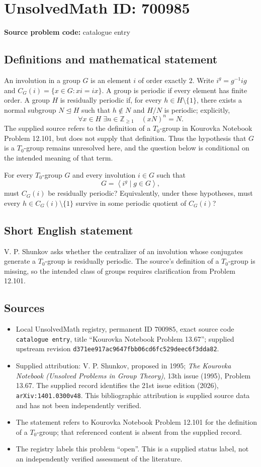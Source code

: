 \documentclass[11pt]{article}
\newcommand{\Z}{\mathbb{Z}}
\begin{document}
\section*{UnsolvedMath ID: 700985}
\textbf{Source problem code:} catalogue entry
\subsection{Definitions and mathematical statement}
An involution in a group \(G\) is an element \(i\) of order exactly \(2\). Write \(i^g=g^{-1}ig\) and \(C_G(i)=\{x\in G:xi=ix\}\). A group is periodic if every element has finite order. A group \(H\) is residually periodic if, for every \(h\in H\setminus\{1\}\), there exists a normal subgroup \(N\trianglelefteq H\) such that \(h\notin N\) and \(H/N\) is periodic; explicitly,
\[
\forall x\in H\;\exists n\in\Z_{\geq 1}\quad (xN)^n=N.
\]
The supplied source refers to the definition of a \(T_0\)-group in Kourovka Notebook Problem 12.101, but does not supply that definition. Thus the hypothesis that \(G\) is a \(T_0\)-group remains unresolved here, and the question below is conditional on the intended meaning of that term.

For every \(T_0\)-group \(G\) and every involution \(i\in G\) such that
\[
G=\left\langle i^g\mid g\in G\right\rangle,
\]
must \(C_G(i)\) be residually periodic? Equivalently, under these hypotheses, must every \(h\in C_G(i)\setminus\{1\}\) survive in some periodic quotient of \(C_G(i)\)?
\subsection{Short English statement}
V. P. Shunkov asks whether the centralizer of an involution whose conjugates generate a \(T_0\)-group is residually periodic. The source's definition of a \(T_0\)-group is missing, so the intended class of groups requires clarification from Problem 12.101.
\subsection{Sources}
\begin{itemize}
\item Local UnsolvedMath registry, permanent ID \(700985\), exact source code \texttt{catalogue entry}, title ``Kourovka Notebook Problem 13.67''; supplied upstream revision \texttt{d371ee917ac9647fbb06cd6fc529deec6f3dda82}.
\item Supplied attribution: V. P. Shunkov, proposed in 1995; \emph{The Kourovka Notebook (Unsolved Problems in Group Theory)}, 13th issue (1995), Problem 13.67. The supplied record identifies the 21st issue edition (2026), \texttt{arXiv:1401.0300v48}. This bibliographic attribution is supplied source data and has not been independently verified.
\item The statement refers to Kourovka Notebook Problem 12.101 for the definition of a \(T_0\)-group; that referenced content is absent from the supplied record.
\item The registry labels this problem ``open''. This is a supplied status label, not an independently verified assessment of the literature.
\end{itemize}
\end{document}
